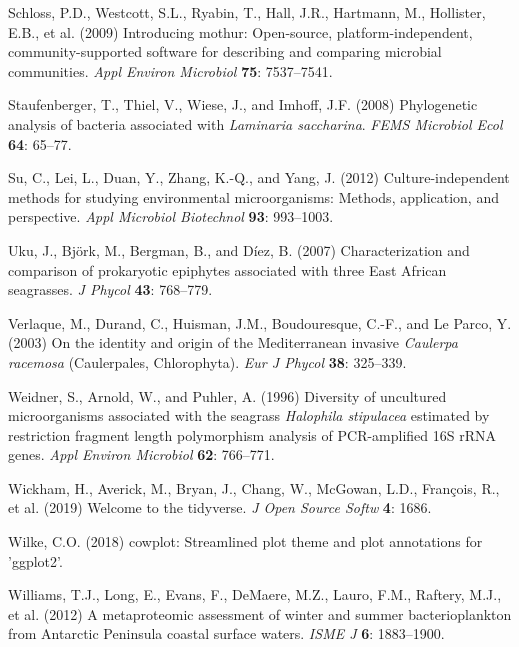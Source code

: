 \documentclass[12pt,]{article}
\begin{document}
\leavevmode\hypertarget{ref-Schloss2009}{}%
Schloss, P.D., Westcott, S.L., Ryabin, T., Hall, J.R., Hartmann, M.,
Hollister, E.B., et al. (2009) Introducing mothur: Open-source,
platform-independent, community-supported software for describing and
comparing microbial communities. \emph{Appl Environ Microbiol}
\textbf{75}: 7537--7541.

\leavevmode\hypertarget{ref-Staufenberger2008}{}%
Staufenberger, T., Thiel, V., Wiese, J., and Imhoff, J.F. (2008)
Phylogenetic analysis of bacteria associated with \emph{Laminaria
saccharina}. \emph{FEMS Microbiol Ecol} \textbf{64}: 65--77.

\leavevmode\hypertarget{ref-Su2012}{}%
Su, C., Lei, L., Duan, Y., Zhang, K.-Q., and Yang, J. (2012)
Culture-independent methods for studying environmental microorganisms:
Methods, application, and perspective. \emph{Appl Microbiol Biotechnol}
\textbf{93}: 993--1003.

\leavevmode\hypertarget{ref-Uku2007}{}%
Uku, J., Björk, M., Bergman, B., and Díez, B. (2007) Characterization
and comparison of prokaryotic epiphytes associated with three East
African seagrasses. \emph{J Phycol} \textbf{43}: 768--779.

\leavevmode\hypertarget{ref-Verlaque2003}{}%
Verlaque, M., Durand, C., Huisman, J.M., Boudouresque, C.-F., and Le
Parco, Y. (2003) On the identity and origin of the Mediterranean
invasive \emph{Caulerpa racemosa} (Caulerpales, Chlorophyta). \emph{Eur
J Phycol} \textbf{38}: 325--339.

\leavevmode\hypertarget{ref-Weidner1996}{}%
Weidner, S., Arnold, W., and Puhler, A. (1996) Diversity of uncultured
microorganisms associated with the seagrass \emph{Halophila stipulacea}
estimated by restriction fragment length polymorphism analysis of
PCR-amplified 16S rRNA genes. \emph{Appl Environ Microbiol} \textbf{62}:
766--771.

\leavevmode\hypertarget{ref-Wickham2019}{}%
Wickham, H., Averick, M., Bryan, J., Chang, W., McGowan, L.D., François,
R., et al. (2019) Welcome to the tidyverse. \emph{J Open Source Softw}
\textbf{4}: 1686.

\leavevmode\hypertarget{ref-Wilke2018}{}%
Wilke, C.O. (2018) cowplot: Streamlined plot theme and plot annotations
for 'ggplot2'.

\leavevmode\hypertarget{ref-Williams2012}{}%
Williams, T.J., Long, E., Evans, F., DeMaere, M.Z., Lauro, F.M.,
Raftery, M.J., et al. (2012) A metaproteomic assessment of winter and
summer bacterioplankton from Antarctic Peninsula coastal surface waters.
\emph{ISME J} \textbf{6}: 1883--1900.
\end{document}
